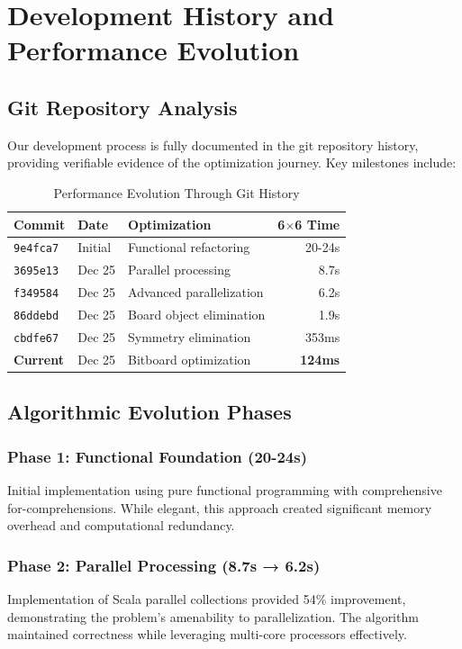 \documentclass[12pt,a4paper]{article}
\theoremstyle{definition}
\begin{document}
\section{Development History and Performance Evolution}

\subsection{Git Repository Analysis}

Our development process is fully documented in the git repository history, providing verifiable evidence of the optimization journey. Key milestones include:

\begin{table}[h]
\centering
\caption{Performance Evolution Through Git History}
\begin{tabular}{@{}lllr@{}}
\toprule
Commit & Date & Optimization & 6$\times$6 Time \\
\midrule
\texttt{9e4fca7} & Initial & Functional refactoring & 20-24s \\
\texttt{3695e13} & Dec 25 & Parallel processing & 8.7s \\
\texttt{f349584} & Dec 25 & Advanced parallelization & 6.2s \\
\texttt{86ddebd} & Dec 25 & Board object elimination & 1.9s \\
\texttt{cbdfe67} & Dec 25 & Symmetry elimination & 353ms \\
\textbf{Current} & Dec 25 & Bitboard optimization & \textbf{124ms} \\
\bottomrule
\end{tabular}
\end{table}

\subsection{Algorithmic Evolution Phases}

\subsubsection{Phase 1: Functional Foundation (20-24s)}
Initial implementation using pure functional programming with comprehensive for-comprehensions. While elegant, this approach created significant memory overhead and computational redundancy.

\subsubsection{Phase 2: Parallel Processing (8.7s → 6.2s)}
Implementation of Scala parallel collections provided 54\% improvement, demonstrating the problem's amenability to parallelization. The algorithm maintained correctness while leveraging multi-core processors effectively.
\end{document}
